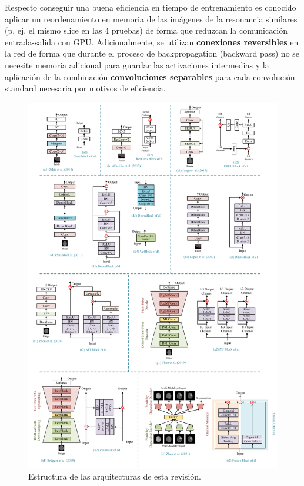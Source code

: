 			Respecto conseguir una buena eficiencia en tiempo de entrenamiento es conocido aplicar un reordenamiento en memoria de las imágenes de la resonancia similares (p. ej. el mismo slice en las 4 pruebas) de forma que reduzcan la comunicación entrada-salida con GPU. Adicionalmente, se utilizan \textbf{conexiones reversibles} en la red de forma que durante el proceso de backpropagation (backward pass) no se necesite memoria adicional para guardar las activaciones intermedias y la aplicación de la combinación \textbf{convoluciones separables} para cada convolución standard necesaria por motivos de eficiencia. 
			
			\begin{figure}[!h]
				\centering
				\includegraphics[width=1.0\linewidth]{imagenes/estructura_revisionhistorica.png}
				\caption{Estructura de las arquitecturas de esta revisión.}
			\end{figure}
			
